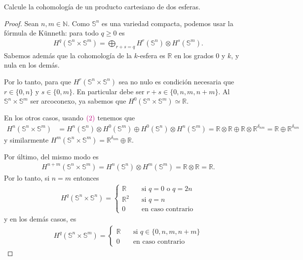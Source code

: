 \documentclass[11pt]{article}
\newcommand{\N}{\mathbb{N}}
\newcommand{\R}{\mathbb{R}}
\newcommand{\Ss}{\mathbb{S}}
\newcommand{\paint}[1]{\color{color}{#1}}
\newenvironment{exercise}[2][Ejercicio]{\begin{trivlist}
\item[\hskip \labelsep \paint{{\bfseries #1}}\hskip \labelsep {\bfseries #2.}]}{\end{trivlist}}
\begin{document}
\begin{exercise}{11 (d)} Calcule la cohomología de un producto cartesiano de dos esferas.
\begin{proof} Sean $n,m \in \N$. Como $\Ss^n$ es una variedad compacta, podemos usar la fórmula de Künneth: para todo $q \geq 0$ es 
\begin{align}
H^q(\Ss^n \times \Ss^m) = \bigoplus_{r+s = q} H^r(\Ss^n) \otimes H^s(\Ss^m).
\end{align}
Sabemos además que la cohomología de la $k$-esfera es $\R$ en los grados $0$ y $k$, y nula en los demás.

Por lo tanto, para que $H^r(\Ss^n \times \Ss^n)$ sea no nulo es condición necesaria que $r\in \{0,n\}$ y $s \in \{0,m\}$. En particular debe ser $r+s \in \{0,n,m,n+m\}$. Al $\Ss^n \times  \Ss^m$ ser arcoconexo, ya sabemos que $H^0(\Ss^n \times \Ss^m) \simeq \R$. 

En los otros casos, usando $\paint{(2)}$ tenemos que
\begin{align*}
H^n(\Ss^n \times \Ss^m) &= H^n(\Ss^n) \otimes H^0(\Ss^m) \oplus H^0(\Ss^n) \otimes H^n(\Ss^m) = \R \otimes \R \oplus \R \otimes \R^{\delta_{nm}} = \R \oplus \R^{\delta_{nm}}
\end{align*}
y similarmente $H^m(\Ss^n \times \Ss^m) = \R^{\delta_{nm}} \oplus \R$. 

Por último, del mismo modo es 
\begin{align*}
H^{n+m}(\Ss^n \times \Ss^m) = H^n(\Ss^n) \otimes H^m(\Ss^m) = \R \otimes \R = \R.
\end{align*}
Por lo tanto, si $n = m$ entonces
\begin{align*}
H^q(\Ss^n \times \Ss^n) = \begin{cases}
\R \quad &\text{si $q = 0$ o $q = 2n$}\\
\R^2 \quad &\text{si $q = n$}\\
0 \quad &\text{en caso contrario}
\end{cases}
\end{align*}
y en los demás casos, es
\begin{align*}
H^q(\Ss^n \times \Ss^m) = \begin{cases}
\R \quad &\text{si $q \in \{0,n,m,n+m\}$}\\
0 \quad &\text{en caso contrario}
\end{cases}
\end{align*}
\end{proof}
\end{exercise}
\end{document}
